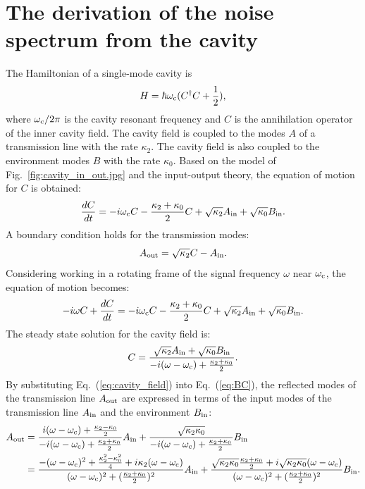 \section{The derivation of the noise spectrum from the cavity} 
\label{sec:cavitynoise}

The Hamiltonian of a single-mode cavity is
\begin{equation}
\label{eq:cavity_Hamiltonian}
    H = \hbar \omega_{\rm c}(C^{\dagger}C+\frac{1}{2}),
\end{equation}
where $\omega_{\rm c}/2\pi$ is the cavity resonant frequency and $C$ is the 
annihilation operator of the inner cavity field. The cavity field is coupled 
to the modes $A$ of a transmission line with the rate $\kappa_2$. The cavity 
field is also coupled to the environment modes $B$ with the rate $\kappa_0$. 
Based on the model of Fig.~\ref{fig:cavity_in_out.jpg} and the input-output 
theory, the equation of motion for $C$ is obtained:
\begin{equation}
\label{eq:EOM}
    \frac{dC}{dt} = -i\omega_{\rm c} C - \frac{\kappa_2+\kappa_0}{2} C + \sqrt{\kappa_2} A_{\rm in} + \sqrt{\kappa_0}B_{\rm in}.
\end{equation}
A boundary condition holds for the transmission modes:
\begin{equation}
\label{eq:BC}
    A_{\rm out} = \sqrt{\kappa_2} C - A_{\rm in}.
\end{equation}
Considering working in a rotating frame of the signal frequency $\omega$ near 
$\omega_{\rm c}$, the equation of motion becomes:
\begin{equation}
\label{eq:EOM_rotating_frame}
    -i\omega C + \frac{dC}{dt} = -i \omega_{\rm c} C - \frac{\kappa_2+\kappa_0}{2} C + \sqrt{\kappa_2} A_{\rm in} + \sqrt{\kappa_0} B_{\rm in}.
\end{equation}
The steady state solution for the cavity field is: 
\begin{equation}
\label{eq:cavity_field}
    C = \frac {\sqrt{\kappa_2} A_{\rm in} + \sqrt{\kappa_0} B_{\rm in}} {-i (\omega-\omega_{\rm c}) + \frac{\kappa_2+\kappa_0}{2} }.
\end{equation}
By substituting Eq.~(\ref{eq:cavity_field}) into Eq.~(\ref{eq:BC}), the 
reflected modes of the transmission line $A_{\rm out}$ are expressed in terms 
of the input modes of the transmission line $A_{\rm in}$ and the environment 
$B_{\rm in}$:
\begin{equation} \label{eq:output_field}
\begin{split}
	 A_{\rm out} & =  \frac{i(\omega - \omega_{\rm c}) + \frac{\kappa_2-\kappa_0}{2}}{-i(\omega - \omega_{\rm c}) + \frac{\kappa_2+\kappa_0}{2}} A_{\rm in} + \frac{\sqrt{\kappa_2 \kappa_0}}{-i(\omega - \omega_{\rm c}) + \frac{\kappa_2+\kappa_0}{2}} B_{\rm in} \\
                           & = \frac{-(\omega-\omega_{\rm c})^2 + \frac{\kappa_2^2-\kappa_0^2}{4}+i\kappa_2(\omega-\omega_{\rm c})}{(\omega-\omega_{\rm c})^2+(\frac{\kappa_2+\kappa_0}{2})^2} A_{\rm in} + \frac{\sqrt{\kappa_2\kappa_0}\frac{\kappa_2+\kappa_0}{2}+i\sqrt{\kappa_2\kappa_0}(\omega-\omega_{\rm c})}{(\omega-\omega_{\rm c})^2+(\frac{\kappa_2+\kappa_0}{2})^2} B_{\rm in}.
\end{split}
\end{equation}
